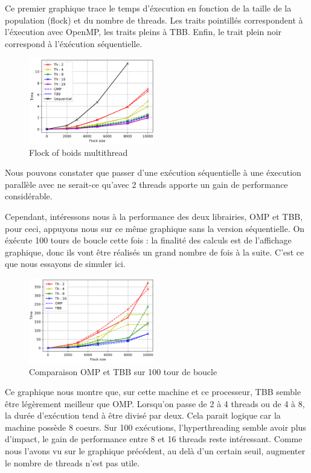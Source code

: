 \documentclass[10pt,twocolumn,letterpaper]{article}
\begin{document}
Ce premier graphique trace le temps d'éxecution en fonction de la taille de la population (flock) et du nombre de threads.
Les traits pointillés correspondent à l'éxecution avec OpenMP, les traits pleins à TBB. Enfin, le trait plein noir correspond à l'éxécution séquentielle.

\begin{figure}[H]
  \centering
  \caption{Flock of boids multithread}
  \includegraphics[width=0.49\textwidth]{figures/boids_with_seq.png}
\end{figure}

Nous pouvons constater que passer d'une exécution séquentielle à une éxecution parallèle avec ne serait-ce qu'avec 2 threads apporte un gain de performance considérable.

Cependant, intéressons nous à la performance des deux librairies, OMP et TBB, pour ceci, appuyons nous sur ce même graphique sans la version séquentielle.
On éxécute 100 tours de boucle cette fois : la finalité des calculs est de l'affichage graphique, donc ils vont être réalisés un grand nombre de fois à la suite.
C'est ce que nous essayons de simuler ici.

\begin{figure}[H]
  \centering
  \caption{Comparaison OMP et TBB sur 100 tour de boucle}
  \includegraphics[width=0.49\textwidth]{figures/boids_100_exec.png}
\end{figure}

Ce graphique nous montre que, sur cette machine et ce processeur, TBB semble être légèrement meilleur que OMP.
Lorsqu'on passe de 2 à 4 threads ou de 4 à 8, la durée d'exécution tend à être divisé par deux.
Cela parait logique car la machine possède 8 coeurs.
Sur 100 exécutions, l'hyperthreading semble avoir plus d'impact, le gain de performance entre 8 et 16 threads reste intéressant.
Comme nous l'avons vu sur le graphique précédent, au delà d'un certain seuil, augmenter le nombre de threads n'est pas utile.
\end{document}
